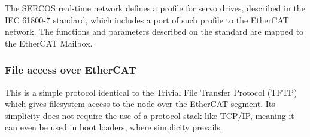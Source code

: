 The SERCOS \texttrademark{} real-time network defines a profile for servo drives, described in the IEC 61800-7 standard, which includes a port of such profile to the EtherCAT network. The functions and parameters described on the standard are mapped to the EtherCAT Mailbox.

\subsubsection*{File access over EtherCAT}

This is a simple protocol identical to the Trivial File Transfer Protocol (TFTP) which gives filesystem access to the node over the EtherCAT segment.
Its simplicity does not require the use of a protocol stack like TCP/IP, meaning it can even be used in boot loaders, where simplicity prevails.
